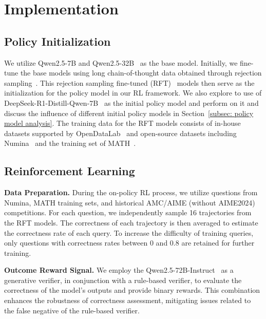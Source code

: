 
\section{Implementation}

\subsection{Policy Initialization}

We utilize Qwen2.5-7B and Qwen2.5-32B~\cite{yang2024qwen2} as the base model. 
Initially, we fine-tune the base models using long chain-of-thought data obtained through rejection sampling~\cite{yuan2023scaling}. 
This rejection sampling fine-tuned (RFT)~\cite{yuan2023scaling} models then serve as the initialization for the policy model in our RL framework.
We also explore to use of DeepSeek-R1-Distill-Qwen-7B~\cite{deepseekr1} as the initial policy model and perform \methodname{} on it and discuss the influence of different initial policy models in Section~\ref{subsec: policy model analysis}.
The training data for the RFT models consists of in-house datasets supported by OpenDataLab~\cite{opendatalab} and open-source datasets including Numina~\cite{li2024numinamath} and the training set of MATH~\cite{hendrycks2021measuring}.

\subsection{Reinforcement Learning}
\label{subsec: rl}

\noindent\textbf{Data Preparation.} During the on-policy RL process, we utilize questions from Numina, MATH training sets, and historical AMC/AIME (without AIME2024) competitions. For each question, we independently sample 16 trajectories from the RFT models. The correctness of each trajectory is then averaged to estimate the correctness rate of each query. To increase the difficulty of training queries, only questions with correctness rates between 0 and 0.8 are retained for further training.

\noindent\textbf{Outcome Reward Signal.} We employ the Qwen2.5-72B-Instruct~\cite{yang2024qwen2} as a generative verifier, in conjunction with a rule-based verifier, to evaluate the correctness of the model's outputs and provide binary rewards. This combination enhances the robustness of correctness assessment, mitigating issues related to the false negative of the rule-based verifier.

